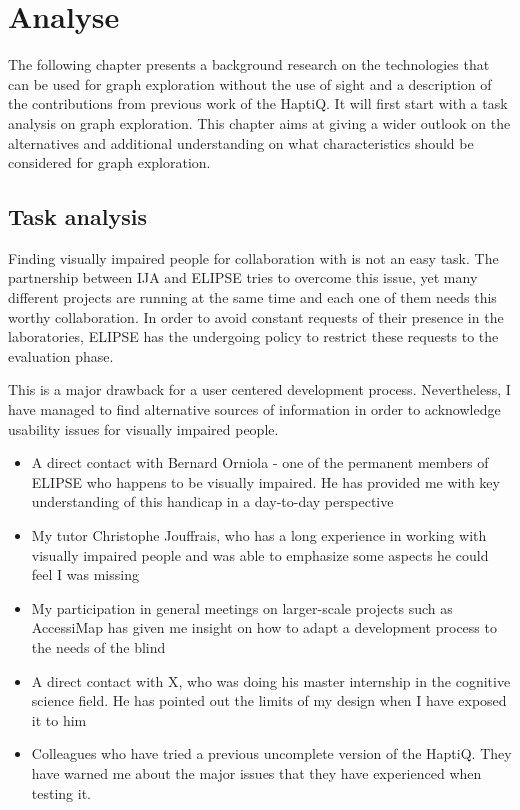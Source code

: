 \chapter{Analyse}

The following chapter presents a background research on the technologies
that can be used for graph exploration without the use of sight and a
description of the contributions from previous work of the HaptiQ. It
will first start with a task analysis on graph exploration. This chapter
aims at giving a wider outlook on the alternatives and additional
understanding on what characteristics should be considered for graph
exploration.

\section{Task analysis}\label{task-analysis}

Finding visually impaired people for collaboration with is not an easy
task. The partnership between IJA and ELIPSE tries to overcome this
issue, yet many different projects are running at the same time and each
one of them needs this worthy collaboration. In order to avoid constant
requests of their presence in the laboratories, ELIPSE has the
undergoing policy to restrict these requests to the evaluation phase.

This is a major drawback for a user centered development process.
Nevertheless, I have managed to find alternative sources of information
in order to acknowledge usability issues for visually impaired people.

\begin{itemize}
\item
  A direct contact with Bernard Orniola - one of the permanent members
  of ELIPSE who happens to be visually impaired. He has provided me with
  key understanding of this handicap in a day-to-day perspective
\item
  My tutor Christophe Jouffrais, who has a long experience in working
  with visually impaired people and was able to emphasize some aspects
  he could feel I was missing
\item
  My participation in general meetings on larger-scale projects such as
  AccessiMap has given me insight on how to adapt a development process
  to the needs of the blind
\item
  A direct contact with X, who was doing his master internship in the
  cognitive science field. He has pointed out the limits of my design
  when I have exposed it to him
\item
  Colleagues who have tried a previous uncomplete version of the HaptiQ.
  They have warned me about the major issues that they have experienced
  when testing it.
\end{itemize}

